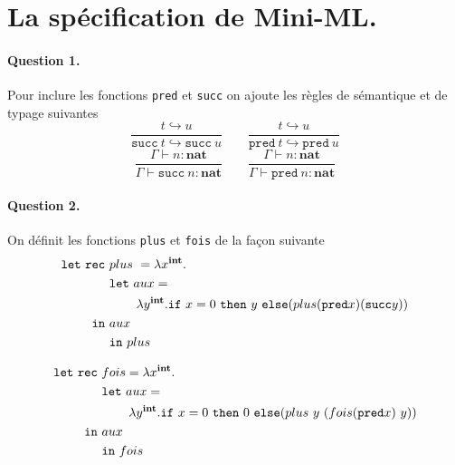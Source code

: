 \documentclass{article}
\title{\titre}
\date{}
\author{\auteur}
\newcommand{\titreCourt}{DM -- Mini-ML}
\newcommand{\auteur}{Marius \textsc{Dufraisse}}
\newcommand{\sem}{\hookrightarrow}
\theoremstyle{thm}
\theoremstyle{def}
\theoremstyle{dem}
\newcommand{\code}[1]{\texttt{#1}}
\newcommand{\codem}[1]{\mathtt{#1}}
\newcommand{\types}[1]{\mathbf{#1}}
\begin{document}
	\renewcommand{\labelitemi}{\textbullet}



	\maketitle
	\section{La spécification de Mini-ML.}

	\paragraph{Question 1.}
	Pour inclure les fonctions \code{pred} et \code{succ} on ajoute les règles de sémantique et de typage suivantes
	\[ \frac{t \sem u}{\codem{succ\ }t\sem\codem{succ\ }{u}}\qquad \frac{t \sem u}{\codem{pred\ }t\sem\codem{pred\ }{u}} \]
	\[\frac{\Gamma\vdash  n : \types{nat}}{\Gamma\vdash \codem{succ\ }n:\types{nat}} \qquad\frac{\Gamma\vdash  n : \types{nat}}{\Gamma\vdash \codem{pred\ }n:\types{nat}}\]

	\paragraph{Question 2.}
	On définit les fonctions \code{plus} et \code{fois} de la façon suivante
	\begin{align*}
		\codem{let\ rec}\ &plus\ = \lambda x^{\types{int}} .\\
		&\codem{let}\ aux = \\
		&\hspace{0.75cm}\lambda y^{\types{int}}.\codem{if\ }x=0\ \codem{then}\ y\ \codem{else}(plus(\codem{pred}x)(\codem{succ}y))\\
		\codem{in}\ &aux\\
		&\codem{in\ }plus
	\end{align*}

	\begin{align*}
		\codem{let\ rec}\ &fois=\lambda x^{\types{int}} .\\
		&\codem{let}\ aux = \\
		&\hspace{0.75cm}\lambda y^{\types{int}}.\codem{if\ }x=0\ \codem{then}\ 0\ \codem{else}(plus\ y\ (fois(\codem{pred}x)\ y))\\
		\codem{in}\ &aux\\
		&\codem{in\ }fois
	\end{align*}
\end{document}
